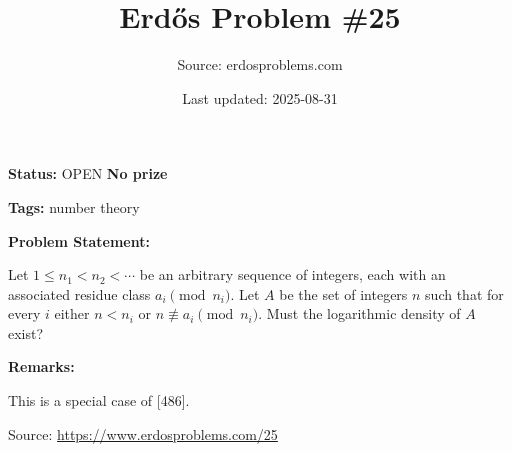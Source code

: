 \documentclass{article}
\title{Erd\H{o}s Problem \#25}
\date{Last updated: 2025-08-31}
\author{Source: erdosproblems.com}
\begin{document}
\maketitle

\noindent\textbf{Status:} OPEN \quad \textbf{No prize}

\noindent\textbf{Tags:} number theory

\medskip
\noindent\textbf{Problem Statement:}

Let $1\leq n_1<n_2<\cdots$ be an arbitrary sequence of integers, each with an associated residue class $a_i\pmod{n_i}$. Let $A$ be the set of integers $n$ such that for every $i$ either $n<n_i$ or $n\not\equiv a_i\pmod{n_i}$. Must the logarithmic density of $A$ exist?

\bigskip
\noindent\textbf{Remarks:}

This is a special case of [486].

\bigskip
\noindent\small{Source: \url{https://www.erdosproblems.com/25}}
\end{document}
